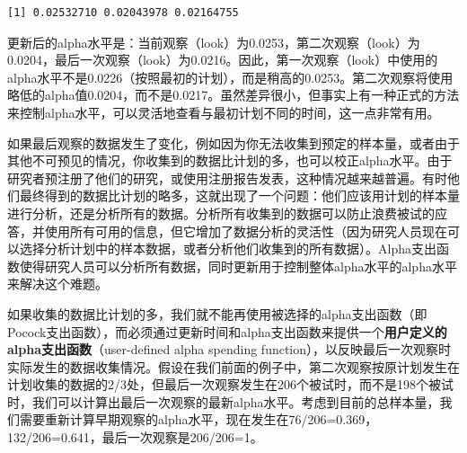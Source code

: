 \documentclass[
  letterpaper,
  DIV=11,
  numbers=noendperiod]{scrreprt}
\newenvironment{Shaded}{\begin{snugshade}}{\end{snugshade}}
\newcommand{\AttributeTok}[1]{\textcolor[rgb]{0.40,0.45,0.13}{#1}}
\newcommand{\DecValTok}[1]{\textcolor[rgb]{0.68,0.00,0.00}{#1}}
\newcommand{\FloatTok}[1]{\textcolor[rgb]{0.68,0.00,0.00}{#1}}
\newcommand{\FunctionTok}[1]{\textcolor[rgb]{0.28,0.35,0.67}{#1}}
\newcommand{\NormalTok}[1]{\textcolor[rgb]{0.00,0.23,0.31}{#1}}
\newcommand{\OtherTok}[1]{\textcolor[rgb]{0.00,0.23,0.31}{#1}}
\newcommand{\SpecialCharTok}[1]{\textcolor[rgb]{0.37,0.37,0.37}{#1}}
\newcommand{\StringTok}[1]{\textcolor[rgb]{0.13,0.47,0.30}{#1}}
\begin{document}
\begin{Shaded}
\end{Shaded}

\begin{verbatim}
[1] 0.02532710 0.02043978 0.02164755
\end{verbatim}

更新后的alpha水平是：当前观察（look）为0.0253，第二次观察（look）为0.0204，最后一次观察（look）为0.0216。因此，第一次观察（look）中使用的alpha水平不是0.0226（按照最初的计划），而是稍高的0.0253。第二次观察将使用略低的alpha值0.0204，而不是0.0217。虽然差异很小，但事实上有一种正式的方法来控制alpha水平，可以灵活地查看与最初计划不同的时间，这一点非常有用。

如果最后观察的数据发生了变化，例如因为你无法收集到预定的样本量，或者由于其他不可预见的情况，你收集到的数据比计划的多，也可以校正alpha水平。由于研究者预注册了他们的研究，或使用注册报告发表，这种情况越来越普遍。有时他们最终得到的数据比计划的略多，这就出现了一个问题：他们应该用计划的样本量进行分析，还是分析所有的数据。分析所有收集到的数据可以防止浪费被试的应答，并使用所有可用的信息，但它增加了数据分析的灵活性（因为研究人员现在可以选择分析计划中的样本数据，或者分析他们收集到的所有数据）。Alpha支出函数使得研究人员可以分析所有数据，同时更新用于控制整体alpha水平的alpha水平来解决这个难题。

如果收集的数据比计划的多，我们就不能再使用被选择的alpha支出函数（即Pocock支出函数），而必须通过更新时间和alpha支出函数来提供一个\textbf{用户定义的alpha支出函数}（user-defined
alpha spending
function），以反映最后一次观察时实际发生的数据收集情况。假设在我们前面的例子中，第二次观察按原计划发生在计划收集的数据的2/3处，但最后一次观察发生在206个被试时，而不是198个被试时，我们可以计算出最后一次观察的最新alpha水平。考虑到目前的总样本量，我们需要重新计算早期观察的alpha水平，现在发生在76/206=0.369，132/206=0.641，最后一次观察是206/206=1。
\end{document}

